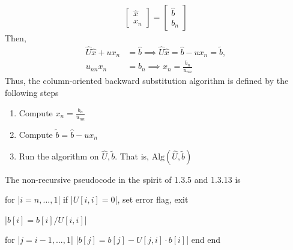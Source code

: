 \documentclass{report}
\begin{document}
\begin{itemize}
\begin{align*}
                \begin{bmatrix}
                    \hat{x} \\ x_{n}
                \end{bmatrix}
                = 
                \begin{bmatrix}
                    \hat{b} \\ b_{n}
                \end{bmatrix}
            \end{align*}
            Then,
            \begin{align*}
                \hat{U}\hat{x} + ux_{n} &= \hat{b} \implies \hat{U}\hat{x} = \hat{b} - ux_{n} = \tilde{b}, \\
                u_{nn}x_{n} &= b_{n} \implies x_{n} = \frac{b_{n}}{u_{nn}}
            \end{align*}
            Thus, the column-oriented backward substitution algorithm is defined by the following steps
            \begin{enumerate}
                \item Compute $x_{n} = \frac{b_{n}}{u_{nn}} $
                \item Compute $\tilde{b} = \hat{b} - ux_{n} $
                \item Run the algorithm on $\hat{U}, \tilde{b}$. That is, $\text{Alg}(\hat{U}, \tilde{b})$
            \end{enumerate}
            \bigbreak \noindent 
            The non-recursive pseudocode in the spirit of 1.3.5 and 1.3.13 is
            \bigbreak \noindent 
            \begin{jlcode}
                for |$i=n,...,1$|
                if |$U[i,i] = 0$|, set error flag, exit

                |$b[i] = b[i] / U[i,i]$|

                for |$j = i-1,...,1$|
                |$b[j] = b[j] - U[j,i] \cdot b[i]$|
                end
                end
            \end{jlcode}


\end{itemize}
\end{document}
